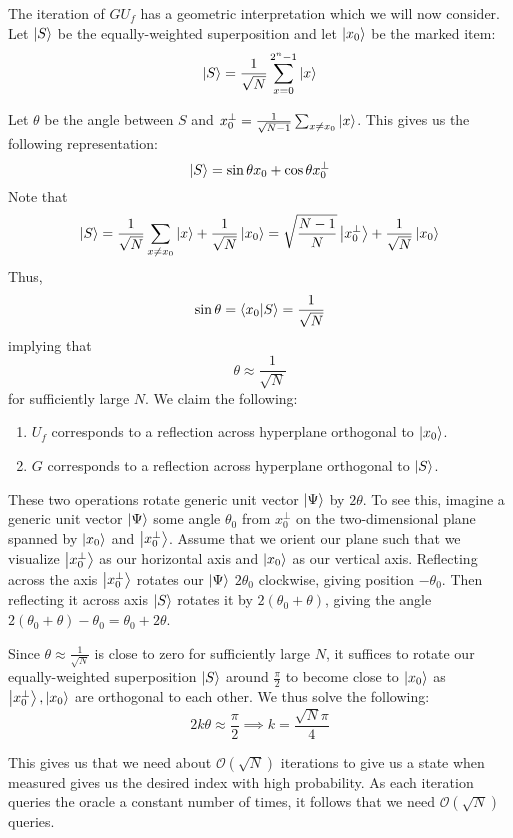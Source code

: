 \documentclass{../quantum.tex}
\begin{document}
The iteration of $GU_f$ has a geometric interpretation which we will now consider. Let $\ket{S}$ be the equally-weighted superposition and let $\ket{x_0}$ be the marked item:
$$ \ket{S} = \frac{1}{\sqrt{N}} \sum_{x=0}^{2^n-1} \ket{x}  $$

Let $\theta$ be the angle between $S$ and $x_0^{\perp} = \frac{1}{\sqrt{N-1}}\sum_{x\neq x_0} \ket{x}$. This gives us the following representation:
$$ \ket{S} =  \sin{\theta}x_0 + \cos{\theta}{x_0^{\perp}}$$
Note that
$$ \ket{S} = \frac{1}{\sqrt{N}}\sum_{x \neq x_0} \ket{x} + \frac{1}{\sqrt{N}}\ket{x_0} = \sqrt{\frac{N-1}{N}}\ket{x_0^{\perp}} + \frac{1}{\sqrt{N}}\ket{x_0}$$
Thus,
$$\sin{\theta} = \bra{x_0}\ket{S} = \frac{1}{\sqrt{N}}$$
implying that
$$ \theta \approx \frac{1}{\sqrt{N}} $$ for sufficiently large $N$.
We claim the following:
\begin{enumerate}
  \item $U_f$ corresponds to a reflection across hyperplane orthogonal to $\ket{x_0}$.
  \item $G$ corresponds to a reflection across hyperplane orthogonal to $\ket{S}$.
\end{enumerate}

These two operations rotate generic unit vector $\ket{\Psi}$ by $2\theta$. To see this, imagine a generic unit vector $\ket{\Psi}$ some angle $\theta_0$ from $x_0^{\perp}$ on the two-dimensional plane spanned by $\ket{x_0}$ and $\ket{x_0^{\perp}}$. Assume that we orient our plane such that we visualize $\ket{x_0^{\perp}}$ as our horizontal axis and $\ket{x_0}$ as our vertical axis. Reflecting across the axis $\ket{x_0^{\perp}}$ rotates our $\ket{\Psi}$ $2\theta_0$ clockwise, giving position $-\theta_0$. Then reflecting it across axis $\ket{S}$ rotates it by $2(\theta_0 + \theta)$, giving the angle $2(\theta_0 + \theta) - \theta_0 = \theta_0 + 2\theta$.

Since $\theta \approx \frac{1}{\sqrt{N}}$ is close to zero for sufficiently large $N$, it suffices to rotate our equally-weighted superposition $\ket{S}$ around $\frac{\pi}{2}$ to become close to $\ket{x_0}$ as $\ket{x_0^{\perp}},\ket{x_0}$ are orthogonal to each other. We thus solve the following:
$$2k\theta \approx \frac{\pi}{2} \implies k = \frac{\sqrt{N}\pi}{4} $$

This gives us that we need about $\mathcal{O}(\sqrt{N})$ iterations to give us a state when measured gives us the desired index with high probability. As each iteration queries the oracle a constant number of times, it follows that we need $\mathcal{O}(\sqrt{N})$ queries.
\end{document}
